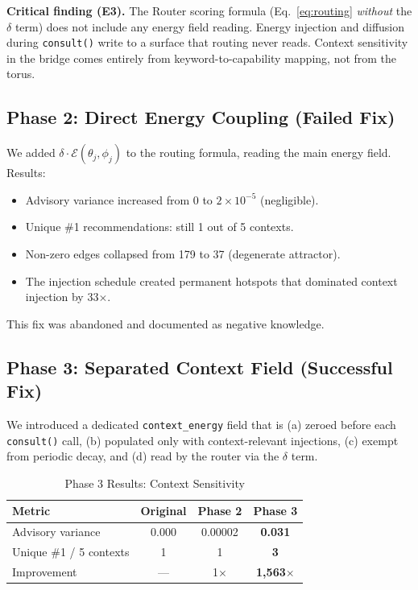 \documentclass[11pt,a4paper]{article}
\begin{document}
\textbf{Critical finding (E3).} The Router scoring formula
(Eq.~\ref{eq:routing} \emph{without} the $\delta$ term) does not
include any energy field reading. Energy injection and diffusion during
\texttt{consult()} write to a surface that routing never reads. Context
sensitivity in the bridge comes entirely from keyword-to-capability
mapping, not from the torus.

\subsection{Phase 2: Direct Energy Coupling (Failed Fix)}

We added $\delta \cdot \mathcal{E}(\theta_j, \phi_j)$ to the routing
formula, reading the main energy field. Results:

\begin{itemize}[leftmargin=*]
\item Advisory variance increased from 0 to $2 \times 10^{-5}$
  (negligible).
\item Unique \#1 recommendations: still 1 out of 5 contexts.
\item Non-zero edges collapsed from 179 to 37 (degenerate attractor).
\item The injection schedule created permanent hotspots that dominated
  context injection by 33$\times$.
\end{itemize}

This fix was abandoned and documented as negative knowledge.

\subsection{Phase 3: Separated Context Field (Successful Fix)}

We introduced a dedicated \texttt{context\_energy} field that is
(a) zeroed before each \texttt{consult()} call, (b) populated only
with context-relevant injections, (c) exempt from periodic decay, and
(d) read by the router via the $\delta$ term.

\begin{table}[h]
\centering
\caption{Phase 3 Results: Context Sensitivity}
\label{tab:phase3}
\begin{tabular}{@{}lccc@{}}
\toprule
\textbf{Metric} & \textbf{Original} & \textbf{Phase 2} & \textbf{Phase 3} \\
\midrule
Advisory variance & 0.000 & 0.00002 & \textbf{0.031} \\
Unique \#1 / 5 contexts & 1 & 1 & \textbf{3} \\
Improvement & --- & 1$\times$ & \textbf{1,563$\times$} \\
\bottomrule
\end{tabular}
\end{table}
\end{document}

